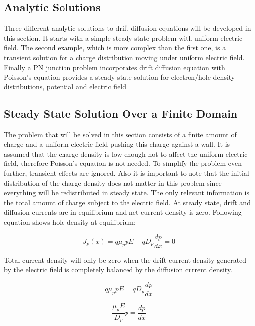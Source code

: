 \begin{doublespace}
\section{Analytic Solutions}

Three different analytic solutions to drift diffusion equations will be developed in this section. It starts with a simple steady state problem with uniform electric field. The second example, which is more complex than the first one, is a  transient solution for a charge distribution moving under uniform electric field. Finally a PN junction problem incorporates drift diffusion equation with Poisson's equation provides a steady state solution for electron/hole density distributions, potential and electric field. 
  
\subsection{Steady State Solution Over a Finite Domain}

The problem that will be solved in this section consists of a finite amount of charge and a uniform electric field pushing this charge against a wall. It is assumed that the charge density is low enough not to affect the uniform electric field, therefore Poisson's equation is not needed. To simplify the problem even further, transient effects are ignored. Also it is important to note that the initial distribution of the charge density does not matter in this problem since everything will be redistributed in steady state. The only relevant information is the total amount of charge subject to the electric field. At steady state, drift and diffusion currents are in equilibrium and net current density is zero. Following equation shows hole density at equilibrium:

\begin{equation}
J_p(x)=q \mu_{p} p E-qD_{p} \frac{dp}{dx} =0
\end{equation}

Total current density will only be zero when the drift current density generated by the electric field is completely balanced by the diffusion current density.

\begin{equation}
q \mu_{p} p E=qD_{p} \frac{dp}{dx}
\end{equation}

\begin{equation}
 \frac{\mu_{p} E}{D_{p}} p  = \frac{dp}{dx}
 \label{pdif}
\end{equation}


\end{doublespace}
